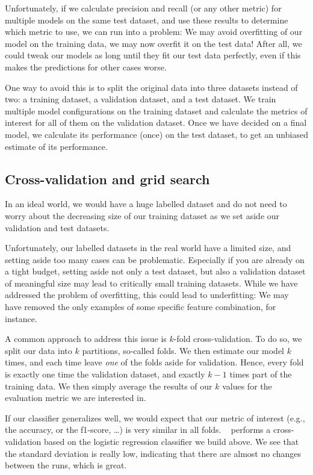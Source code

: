 Unfortunately, if we calculate precision and recall (or any other
metric) for multiple models on the same test dataset, and use these
results to determine which metric to use, we can run into a problem:
We may avoid overfitting of our model on the training data, we may now
overfit it on the test data! After all, we could tweak our models as
long until they fit our test data perfectly, even if this makes the
predictions for other cases worse.

One way to avoid this is to split the original data into three
datasets instead of two: a training dataset, a validation dataset, and
a test dataset.  We train multiple model configurations on the
training dataset and calculate the metrics of interest for all of them
on the validation dataset.  Once we have decided on a final model, we
calculate its performance (once) on the test dataset, to get an
unbiased estimate of its performance.



\subsection{Cross-validation and grid search}
\label{sec:crossvalidation}
In an ideal world, we would have a huge labelled dataset and do not
need to worry about the decreasing size of our training dataset as we
set aside our validation and test datasets.

Unfortunately, our labelled datasets in the real world have a limited
size, and setting aside too many cases can be problematic. Especially
if you are already on a tight budget, setting aside not only a test
dataset, but also a validation dataset of meaningful size may lead to
critically small training datasets. While we have addressed the
problem of overfitting, this could lead to underfitting: We may have
removed the only examples of some specific feature combination, for
instance.

A common approach to address this issue is $k$-fold
cross-validation. To do so, we split our data into $k$ partitions,
so-called folds. We then estimate our model $k$ times, and each time
leave \emph{one} of the folds aside for validation. Hence, every fold
is exactly one time the validation dataset, and exactly $k-1$ times
part of the training data. We then simply average the results of our
$k$ values for the evaluation metric we are interested in.

If our classifier generalizes well, we would expect that our metric of
interest (e.g., the accuracy, or the f1-score, \ldots) is very similar
in all folds. ~ performs a cross-validation based on
the logistic regression classifier we build above. We see that the
standard deviation is really low, indicating that there are almost no
changes between the runs, which is great.

